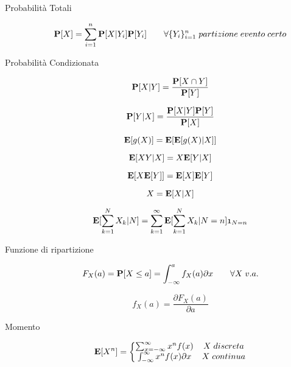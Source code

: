 \begin{description}
	\item[Probabilità Totali]
	\begin{equation}
	\mathbf{P}[X]=\sum_{i=1}^{n}\mathbf{P}[X|Y_{i}]\mathbf{P}[Y_{i}]
	\qquad
	\forall \{Y_{i}\}_{i=1}^{n}\;partizione\;evento\;certo
	\end{equation}
	
	\item[Probabilità Condizionata]
	\begin{equation}
	\mathbf{P}[X|Y]=\frac{\mathbf{P}[X \cap Y]}{\mathbf{P}[Y]}
	\end{equation}
	
	\begin{equation}
	\mathbf{P}[Y|X]=\frac{\mathbf{P}[X|Y]\mathbf{P}[Y]}{\mathbf{P}[X]}
	\end{equation}
	
	\begin{equation}
	\mathbf{E}[g(X)] = \mathbf{E}[\mathbf{E}[g(X)|X]]
	\end{equation}
	
	\begin{equation}
	\mathbf{E}[XY|X] = X\mathbf{E}[Y|X]
	\end{equation}
	
	\begin{equation}
	\mathbf{E}[X\mathbf{E}[Y]] = \mathbf{E}[X]\mathbf{E}[Y]
	\end{equation}
	
	\begin{equation}
	X=\mathbf{E}[X|X]
	\end{equation}
	
	\begin{equation}
	\mathbf{E}[\sum_{k=1}^{N} X_{k}|N] = \sum_{k=1}^{\infty}\mathbf{E}[\sum_{k=1}^{N}X_{k}|N=n]\mathfrak{1}_{N=n}
	\end{equation}
	
	\item [Funzione di ripartizione]
		\begin{equation}
		F_{X}(a) = \mathbf{P}[X \leq a] = \int_{-\infty}^{a} f_{X}(a) \partial x \qquad\forall X \; v.a.
		\end{equation}
		
		\begin{equation}
		f_{X}(a) = \frac{\partial F_{X}(a)}{\partial a}
		\end{equation}
		
	\item [Momento]	
		\begin{equation}
		\mathbf{E}[X^{n}] = \left\{\begin{matrix}
		\sum_{x=-\infty}^{\infty} x^{n} f(x) & X \; discreta \\
		\int_{-\infty}^{\infty} x^{n} f(x) \partial x & X \; continua
		\end{matrix}\right.
		\end{equation}
	

\end{description}
